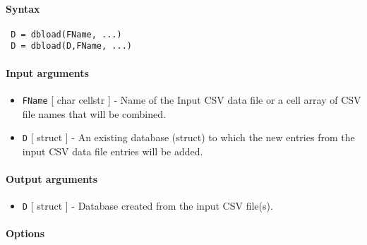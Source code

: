 


	\paragraph{Syntax}
 
 \begin{verbatim}
 D = dbload(FName, ...)
 D = dbload(D,FName, ...)
 \end{verbatim}
 
 \paragraph{Input arguments}
 
 \begin{itemize}
 \item
   \texttt{FName} {[} char \textbar{} cellstr {]} - Name of the Input CSV
   data file or a cell array of CSV file names that will be combined.
 \item
   \texttt{D} {[} struct {]} - An existing database (struct) to which the
   new entries from the input CSV data file entries will be added.
 \end{itemize}
 
 \paragraph{Output arguments}
 
 \begin{itemize}
 \item
   \texttt{D} {[} struct {]} - Database created from the input CSV
   file(s).
 \end{itemize}
 
 \paragraph{Options}
 
